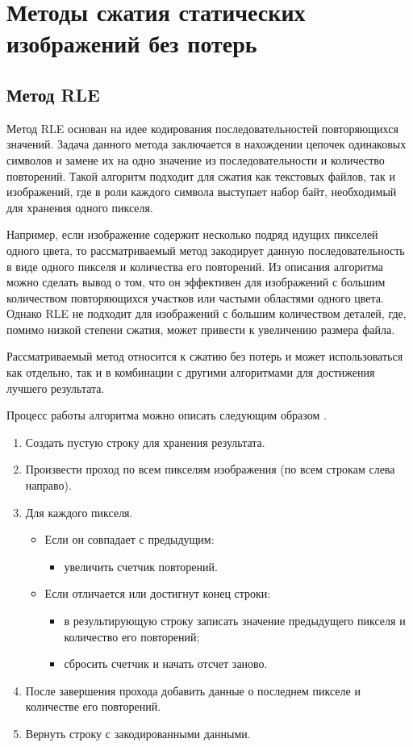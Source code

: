 \section{Методы сжатия статических изображений без потерь}

\subsection{Метод RLE}

Метод RLE \cite{RLE} основан на идее кодирования последовательностей повторяющихся значений. Задача данного метода заключается в нахождении цепочек одинаковых символов и замене их на одно значение из последовательности и количество повторений. Такой алгоритм подходит для сжатия как текстовых файлов, так и изображений, где в роли каждого символа выступает набор байт, необходимый для хранения одного пикселя.

Например, если изображение содержит несколько подряд идущих пикселей одного цвета, то рассматриваемый метод закодирует данную последовательность в виде одного пикселя и количества его повторений. Из описания алгоритма можно сделать вывод о том, что он эффективен для изображений с большим количеством повторяющихся участков или частыми областями одного цвета. Однако RLE не подходит для изображений с большим количеством деталей, где, помимо низкой степени сжатия, может привести к увеличению размера файла.

Рассматриваемый метод относится к сжатию без потерь и может использоваться как отдельно, так и в комбинации с другими алгоритмами для достижения лучшего результата.

Процесс работы алгоритма можно описать следующим образом \cite{article-rle}.
\begin{enumerate}
    \item Создать пустую строку для хранения результата.
    \item Произвести проход по всем пикселям изображения (по всем строкам слева направо).
    \item Для каждого пикселя.
    \begin{itemize}
        \item Если он совпадает с предыдущим:
        \begin{itemize}
            \item увеличить счетчик повторений.
        \end{itemize}
        \item Если отличается или достигнут конец строки:
        \begin{itemize}
            \item в результирующую строку записать значение предыдущего пикселя и количество его повторений;
            \item сбросить счетчик и начать отсчет заново.
        \end{itemize}
    \end{itemize}
    \item После завершения прохода добавить данные о последнем пикселе и количестве его повторений.
    \item Вернуть строку с закодированными данными.
\end{enumerate}

